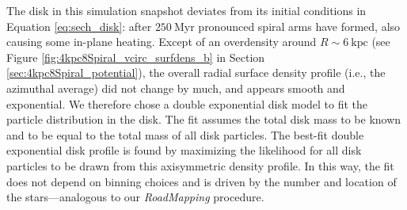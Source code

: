 \documentclass[iop,revtex4,numberedappendix,appendixfloats]{emulateapj}
\newcommand{\RM}{{\sl RoadMapping}}
\begin{document}
The disk in this simulation snapshot deviates from its initial conditions in Equation \eqref{eq:sech_disk}: after $250~\text{Myr}$ pronounced spiral arms have formed, also causing some in-plane heating. Except of an overdensity around $R\sim6~\text{kpc}$ (see Figure \ref{fig:4kpc8Spiral_vcirc_surfdens_b} in Section \ref{sec:4kpc8Spiral_potential}), the overall radial surface density profile (i.e., the azimuthal average) did not change by much, and appears smooth and exponential. We therefore chose a double exponential disk model to fit the particle distribution in the disk. The fit assumes the total disk mass to be known and to be equal to the total mass of all disk particles. The best-fit double exponential disk profile is found by maximizing the likelihood for all disk particles to be drawn from this axisymmetric density profile. In this way, the fit does not depend on binning choices and is driven by the number and location of the stars---analogous to our \RM{} procedure. 
\end{document}
